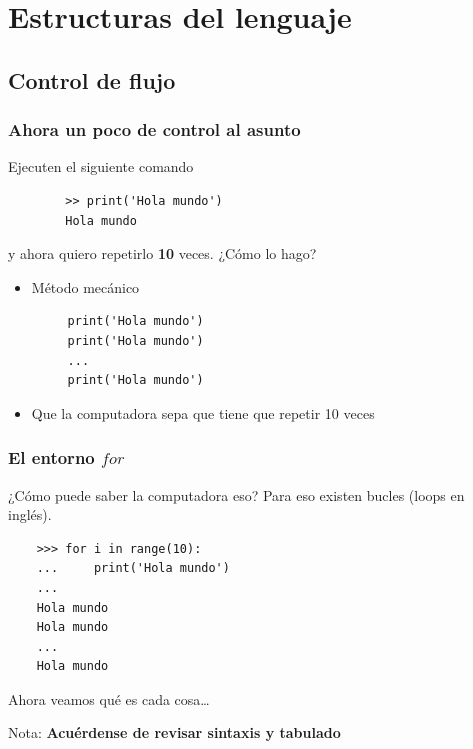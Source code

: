 \documentclass{beamer}
\begin{document}

\section{Estructuras del lenguaje}
\subsection{Control de flujo}
\begin{frame}[fragile]
    \frametitle{Ahora un poco de control al asunto}
    Ejecuten el siguiente comando
    \begin{verbatim}
        >> print('Hola mundo')
        Hola mundo
    \end{verbatim}
    y ahora quiero repetirlo \textbf{10} veces. ¿Cómo lo hago?
    \begin{itemize}
    \item<+> Método mecánico \begin{verbatim}
     print('Hola mundo')
     print('Hola mundo')
     ...
     print('Hola mundo')
    \end{verbatim}
    \item<+> Que la computadora sepa que tiene que repetir 10 veces
    \end{itemize}
\end{frame}

\begin{frame}[fragile]
    \frametitle{El entorno $for$}
    ¿Cómo puede saber la computadora eso? Para eso existen bucles (loops en inglés). 
    \begin{verbatim}
    >>> for i in range(10):
    ...     print('Hola mundo')
    ...
    Hola mundo
    Hola mundo
    ...
    Hola mundo
    \end{verbatim}
    Ahora veamos qué es cada cosa\ldots
    
    \vspace{5mm}
    \tiny{Nota: \textbf{Acuérdense de revisar sintaxis y tabulado}}
\end{frame}
    
    

\end{document}
